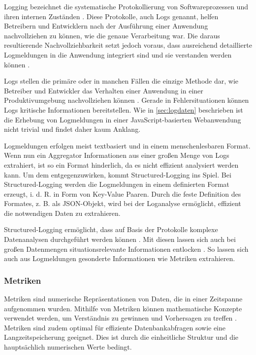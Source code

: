 Logging bezeichnet die systematische Protokollierung von Softwareprozessen und ihren internen Zuständen \cite{LearningToLog}. Diese Protokolle, auch Logs genannt, helfen Betreibern und Entwicklern nach der Ausführung einer Anwendung nachvollziehen zu können, wie die genaue Verarbeitung war. Die daraus resultierende Nachvollziehbarkeit setzt jedoch voraus, dass ausreichend detaillierte Logmeldungen in die Anwendung integriert sind und sie verstanden werden können \cite{LearningToLog}.

Logs stellen die primäre oder in manchen Fällen die einzige Methode dar, wie Betreiber und Entwickler das Verhalten einer Anwendung in einer Produktivumgebung nachvollziehen können  \cite{EventLogsForTheAnalysisOfSoftwareFailures} \cite{LearningToLog}. Gerade in Fehlersituationen können Logs kritische Informationen bereitstellen. Wie in \autoref{sec:logdaten} beschrieben ist die Erhebung von Logmeldungen in einer JavaScript-basierten Webanwendung nicht trivial und findet daher kaum Anklang.

Logmeldungen erfolgen meist textbasiert und in einem menschenlesbaren Format. Wenn nun ein Aggregator Informationen aus einer großen Menge von Logs extrahiert, ist so ein Format hinderlich, da es nicht effizient analysiert werden kann. Um dem entgegenzuwirken, kommt Structured-Logging ins Spiel. Bei Structured-Logging \cite{StructuredAndInteroperableLogging} werden die Logmeldungen in einem definierten Format erzeugt, i. d. R. in Form von Key-Value Paaren. Durch die feste Definition des Formates, z. B. als JSON-Objekt, wird bei der Loganalyse ermöglicht, effizient die notwendigen Daten zu extrahieren.

Structured-Logging ermöglicht, dass auf Basis der Protokolle komplexe Datenanalysen durchgeführt werden können \cite{StructuredAndInteroperableLogging}. Mit diesen lassen sich auch bei großen Datenmengen situationsrelevante Informationen entlocken \cite{StructuredLoggingCraftingUsefulMessageContent}. So lassen sich auch aus Logmeldungen gesonderte Informationen wie Metriken extrahieren.

\subsubsection{Metriken}

Metriken sind numerische Repräsentationen von Daten, die in einer Zeitspanne aufgenommen wurden. Mithilfe von Metriken können mathematische Konzepte verwendet werden, um Verständnis zu gewinnen und Vorhersagen zu treffen \cite{DistributedSystemsObservability}. Metriken sind zudem optimal für effiziente Datenbankabfragen sowie eine Langzeitspeicherung geeignet. Dies ist durch die einheitliche Struktur und die hauptsächlich numerischen Werte bedingt.

